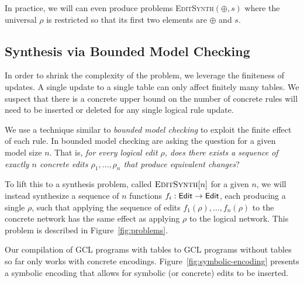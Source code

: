 In practice, we will can even produce problems \textsc{EditSynth}$(\oplus,s)$
where the universal $\rho$ is restricted so that its first two elements are
$\oplus$ and $s$.



\subsection{Synthesis via Bounded Model Checking}


In order to shrink the complexity of the problem, we leverage the finiteness of
updates. A single update to a single table can only affect finitely many
tables. We suspect that there is a concrete upper bound on the number of
concrete rules will need to be inserted or deleted for any single logical rule
update. 

We use a technique similar to \emph{bounded model checking} to exploit the
finite effect of each rule. In bounded model checking are asking the question
for a given model size $n$. That is, \emph{for every logical edit $\rho$, does
  there exists a sequence of exactly $n$ concrete edits $\rho_1, \ldots, \rho_n$
  that produce equivalent changes}?

To lift this to a synthesis problem, called $\textsc{EditSynth}[n]$ for a given
$n$, we will instead synthesize a sequence of $n$ functions
$f_i : \mathsf{Edit} \to \mathsf{Edit}$, each producing a single $\rho$, such that applying the
sequence of edits $f_1(\rho), \ldots, f_n(\rho)$ to the concrete network has the
same effect as applying $\rho$ to the logical network. This problem is described
in Figure~\ref{fig:problems}.

Our compilation of GCL programs with tables to GCL programs without tables so
far only works with concrete encodings. Figure~\ref{fig:symbolic-encoding} presents a
symbolic encoding that allows for symbolic (or concrete) edits to be inserted.

